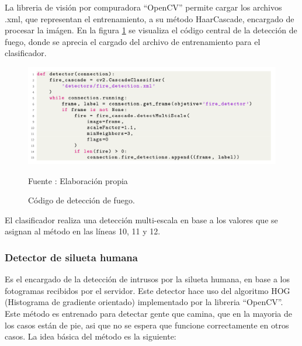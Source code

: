La libreria de visión por compuradora ``OpenCV'' permite cargar los archivos .xml, que representan el entrenamiento, a su método HaarCascade, encargado de procesar la imágen. En la figura \ref{fig:fire_detector} se visualiza el código central de la detección de fuego, donde se aprecia el cargado del archivo de entrenamiento para el clasificador.\\



\begin{figure}[H]
    \begin{center}
        \includegraphics[width=18cm]{img/capitulo_5/fire_detector.png}
    \end{center}
    \begin{center}
        \caption{Código de detección de fuego.}
        Fuente : Elaboración propia
        \label{fig:fire_detector}
    \end{center}
\end{figure}

El clasificador realiza una detección multi-escala en base a los valores que se asignan al método en las líneas 10, 11 y 12.\\

\subsubsection{Detector de silueta humana}
Es el encargado de la detección de intrusos por la silueta humana, en base a los fotogramas recibidos por el servidor. Este detector hace uso del algoritmo HOG (Histograma de gradiente orientado) implementado por la libreria ``OpenCV''. Este método es entrenado para detectar gente que camina, que en la mayoria de los casos están de pie, asi que no se espera que funcione correctamente en otros casos.
La idea básica del método es la siguiente:\\

